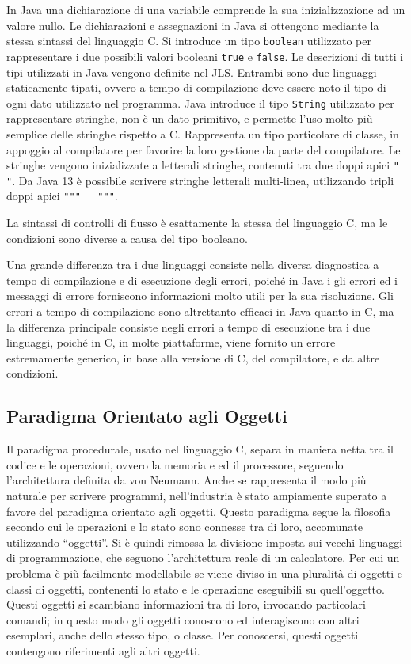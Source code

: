 \documentclass{article}
\numberwithin{equation}{subsection}
\begin{document}
In Java una dichiarazione di una variabile comprende la sua inizializzazione ad un valore nullo. Le dichiarazioni e assegnazioni in Java si ottengono mediante la stessa 
sintassi del linguaggio C. Si introduce un tipo \verb|boolean| utilizzato per rappresentare i due possibili valori booleani \verb|true| e \verb|false|. Le descrizioni di 
tutti i tipi utilizzati in Java vengono definite nel JLS. Entrambi sono due linguaggi staticamente tipati, ovvero a tempo di compilazione deve essere noto il tipo di ogni 
dato utilizzato nel programma. 
Java introduce il tipo \verb|String| utilizzato per rappresentare stringhe, non è un dato primitivo, e permette l'uso molto più semplice delle stringhe rispetto a C. Rappresenta 
un tipo particolare di classe, in appoggio al compilatore per favorire la loro gestione da parte del compilatore. Le stringhe vengono inizializzate a letterali stringhe, 
contenuti tra due doppi apici \verb|"  "|. Da Java 13 è possibile scrivere stringhe letterali multi-linea, utilizzando tripli doppi apici \verb|"""   """|. 

La sintassi di controlli di flusso è esattamente la stessa del linguaggio C, ma le condizioni sono diverse a causa del tipo booleano. 

Una grande differenza tra i due linguaggi consiste nella diversa diagnostica a tempo di compilazione e di esecuzione degli errori, poiché in Java i gli errori ed i messaggi 
di errore forniscono informazioni molto utili per la sua risoluzione. 
Gli errori a tempo di compilazione sono altrettanto efficaci in Java quanto in C, ma  la differenza principale consiste negli errori a tempo di esecuzione tra i due linguaggi, 
poiché in C, in molte piattaforme, viene fornito un errore estremamente generico, in base alla versione di C, del compilatore, e da altre condizioni. 

\subsection{Paradigma Orientato agli Oggetti}

Il paradigma procedurale, usato nel linguaggio C, separa in maniera netta tra il codice e le operazioni, ovvero la memoria e ed il processore, seguendo l'architettura 
definita da von Neumann. Anche se rappresenta il modo più naturale per scrivere programmi, nell'industria è stato ampiamente superato a favore del paradigma orientato agli 
oggetti. 
Questo paradigma segue la filosofia secondo cui le operazioni e lo stato sono connesse tra di loro, accomunate utilizzando ``oggetti''. Si è quindi rimossa la divisione imposta 
sui vecchi linguaggi di programmazione, che seguono l'architettura reale di un calcolatore. Per cui un problema è più facilmente modellabile se viene diviso in una pluralità 
di oggetti e classi di oggetti, contenenti lo stato e le operazione eseguibili su quell'oggetto. Questi oggetti si scambiano informazioni tra di loro, invocando particolari 
comandi; in questo modo gli oggetti conoscono ed interagiscono con altri esemplari, anche dello stesso tipo, o classe. Per conoscersi, questi oggetti contengono riferimenti 
agli altri oggetti. 
\end{document}
